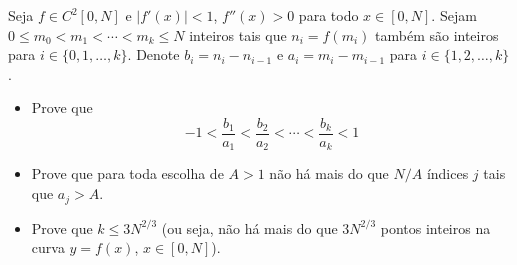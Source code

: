 Seja \(f\in C^2[0,N]\) e \(|f'(x)|<1\), \(f''(x)>0\) para todo \(x\in [0, N]\). Sejam \(0\leq m_0<m_1<\cdots<m_k\leq N\) inteiros tais que \(n_i=f(m_i)\) também são inteiros para \(i\in\{0,1,\ldots, k\}\). Denote \(b_i=n_i-n_{i-1}\) e \(a_i=m_i-m_{i-1}\) para \(i\in\{1,2,\ldots, k\}\).
\begin{itemize}

\item[(a)] Prove que
\[-1<\frac{b_1}{a_1}<\frac{b_2}{a_2}<\cdots < \frac{b_k}{a_k}<1\]
\item[(b)] Prove que para toda escolha de \(A>1\) não há mais do que \(N / A\) índices \(j\) tais que \(a_j>A\).

\item[(c)] Prove que \(k\leq 3N^{2/3}\) (ou seja, não há mais do que \(3N^{2/3}\) pontos inteiros na curva \(y=f(x)\), \(x\in [0,N]\)).
\end{itemize}
